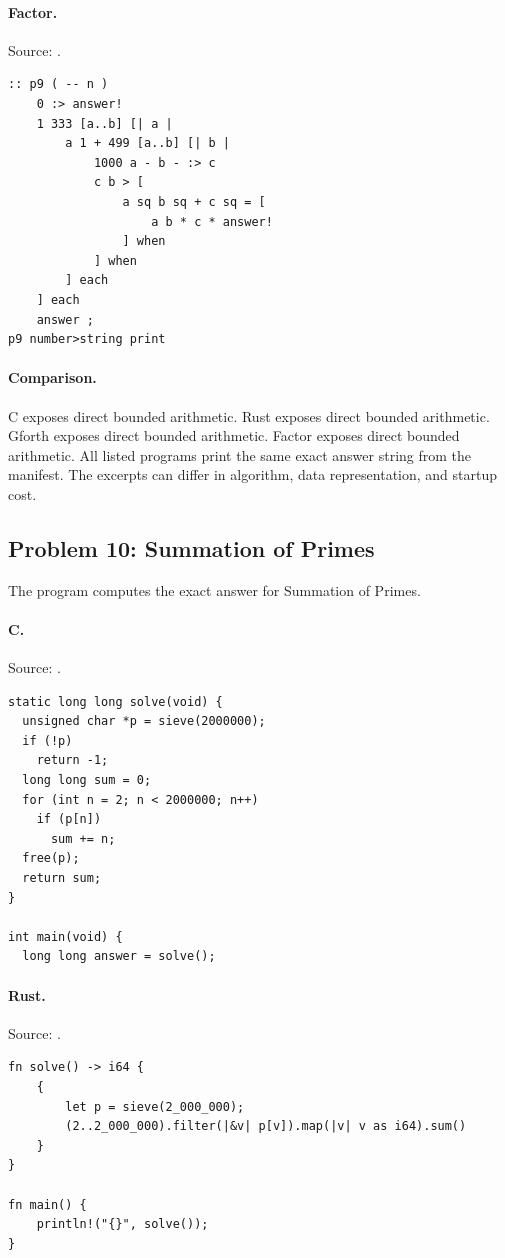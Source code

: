 \paragraph{Factor.} Source: .
\begin{lstlisting}
:: p9 ( -- n )
    0 :> answer!
    1 333 [a..b] [| a |
        a 1 + 499 [a..b] [| b |
            1000 a - b - :> c
            c b > [
                a sq b sq + c sq = [
                    a b * c * answer!
                ] when
            ] when
        ] each
    ] each
    answer ;
p9 number>string print
\end{lstlisting}

\paragraph{Comparison.}
C exposes direct bounded arithmetic. Rust exposes direct bounded arithmetic. Gforth exposes direct bounded arithmetic. Factor exposes direct bounded arithmetic.
All listed programs print the same exact answer string from the manifest. The excerpts can differ in algorithm, data representation, and startup cost.

\subsection{Problem 10: Summation of Primes}
\label{walkthrough:p10}
The program computes the exact answer for Summation of Primes.

\paragraph{C.} Source: .
\begin{lstlisting}
static long long solve(void) {
  unsigned char *p = sieve(2000000);
  if (!p)
    return -1;
  long long sum = 0;
  for (int n = 2; n < 2000000; n++)
    if (p[n])
      sum += n;
  free(p);
  return sum;
}

int main(void) {
  long long answer = solve();
\end{lstlisting}

\paragraph{Rust.} Source: .
\begin{lstlisting}
fn solve() -> i64 {
    {
        let p = sieve(2_000_000);
        (2..2_000_000).filter(|&v| p[v]).map(|v| v as i64).sum()
    }
}

fn main() {
    println!("{}", solve());
}
\end{lstlisting}


